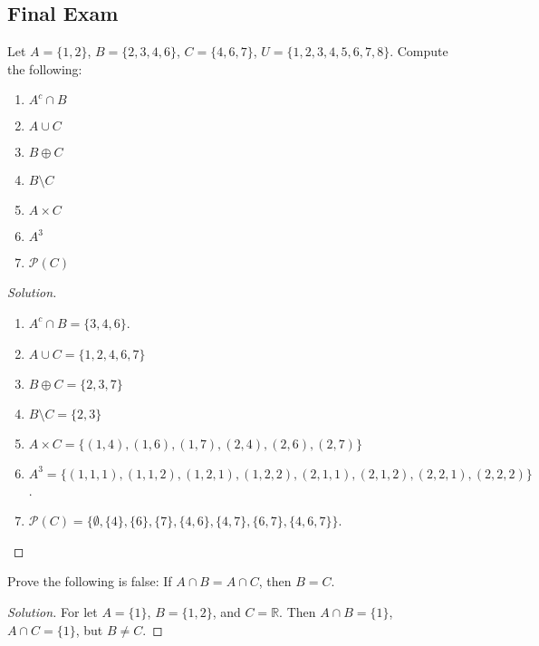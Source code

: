     \subsection{Final Exam}
    \begin{problem}
    Let $A = \{1,2\}$, $B = \{2,3,4,6\}$, $C = \{4,6,7\}$, $U = \{1,2,3,4,5,6,7,8\}$. Compute the following:
    \begin{enumerate}
        \item $A^c \cap B$
        \item $A\cup C$
        \item $B\oplus C$
        \item $B\setminus C$
        \item $A\times C$
        \item $A^3$
        \item $\mathcal{P}(C)$
    \end{enumerate}
    \end{problem}
    \begin{proof}[Solution]
    \vspace{-\topsep}
    \
    \begin{enumerate}
        \item $A^c \cap B = \{3,4,6\}$.
        \item $A \cup C = \{1,2,4,6,7\}$
        \item $B\oplus C = \{2,3,7\}$
        \item $B\setminus C = \{2,3\}$
        \item $A\times C = \{(1,4),(1,6),(1,7),(2,4),(2,6),(2,7)\}$
        \item $A^3 = \{(1,1,1),(1,1,2),(1,2,1),(1,2,2),(2,1,1),(2,1,2),(2,2,1),(2,2,2)\}$.
        \item $\mathcal{P}(C) = \{\emptyset, \{4\},\{6\},\{7\},\{4,6\},\{4,7\},\{6,7\},\{4,6,7\}\}$.
    \end{enumerate}
    \end{proof}
    \begin{problem}
    Prove the following is false: If $A\cap B = A \cap C$, then $B = C$.
    \end{problem}
    \begin{proof}[Solution]
    \vspace{-0.5\topsep}
    For let $A = \{1\}$, $B = \{1,2\}$, and $C = \mathbb{R}$. Then $A\cap B = \{1\}$, $A\cap C = \{1\}$, but $B \ne C$.
    \end{proof}

